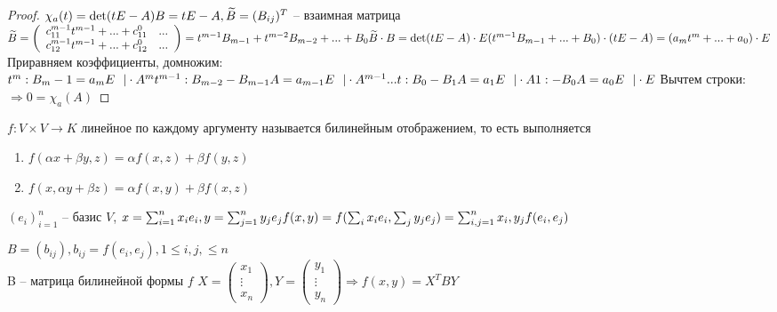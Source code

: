 \begin{proof}
	$\chi_a(t) = \det (tE-A)\\
	B = tE-A, \widetilde{B} = (B_{ij})^T$ -- взаимная матрица\\
	$\widetilde{B} = \left(
		\begin{array}{ccc}	
		c_{11}^{m-1} t^{m-1} + ... + c_{11}^0 & ... \\
		c_{12}^{m-1}t^{m-1} + ... + c_{12}^0 & ...
	\end{array}\right) = t^{m-1}B_{m-1} + t^{m-2} B_{m-2} + ... + B_0\\
	\widetilde{B} \cdot B = \det (tE - A) \cdot E\\
	(t^{m-1}B_{m-1} + ... + B_0) \cdot (tE - A) = (a_m t^m + ... + a_0) \cdot E$\\
	Приравняем коэффициенты, домножим:
	$t^m: B_m-1 = a_m E \ \ | \cdot A^m\\
	t^{m-1}: B_{m-2} - B_{m-1} A = a_{m-1} E \ \ |\cdot A^{m-1}\\
	...\\
	t: B_0 - B_1A = a_1 E \ \ |\cdot A\\
	1: -B_0A = a_0E \ \ |\cdot E\\$
	Вычтем строки: $\Rightarrow 0 = \chi_a(A)$
\end{proof}

\begin{Def} 
	$f: V \times V \to K$ линейное по каждому аргументу называется билинейным отображением, то есть выполняется\\
	\begin{enumerate}
		\item $f(\alpha x + \beta y, z) = \alpha f(x,z) + \beta f(y,z)$
		\item $f(x, \alpha y + \beta z) = \alpha f(x, y) + \beta f(x, z)$
	\end{enumerate}

	$(e_i)_{i=1}^n$ -- базис $V$, $x = \sum_{i=1}^{n} x_ie_i, y = \sum_{j=1}^{n} y_je_j\\
	f(x, y) = f(\sum_{i} x_ie_i, \sum_{j} y_je_j) = \sum_{i, j = 1}^{n} x_i, y_j f(e_i, e_j) $
\end{Def} 

\begin{Def} 
	$B = (b_{ij}), b_{ij} = f(e_i, e_j), 1 \leqslant i, j, \leqslant n$\\
	B -- матрица билинейной формы $f$
	$X = \left(
		\begin{array}{c}	
		x_1\\
		\vdots\\
		x_n
	\end{array}\right), Y = \left(
	\begin{array}{ccc}	
		y_1\\
		\vdots\\
		y_n
	\end{array}\right) \Rightarrow f(x, y) = X^T B Y$
\end{Def} 

